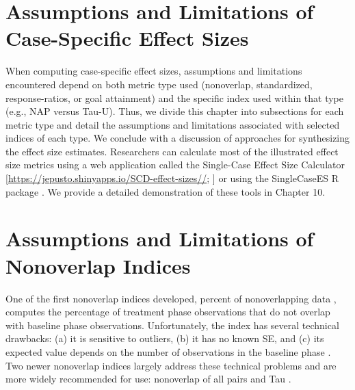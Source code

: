 \documentclass[
]{book}
\begin{document}
\hypertarget{assumptions-and-limitations-of-case-specific-effect-sizes}{%
\section{Assumptions and Limitations of Case-Specific Effect Sizes}\label{assumptions-and-limitations-of-case-specific-effect-sizes}}

When computing case-specific effect sizes, assumptions and limitations encountered depend on both metric type used (nonoverlap, standardized, response-ratios, or goal attainment) and the specific index used within that type (e.g., NAP versus Tau-U). Thus, we divide this chapter into subsections for each metric type and detail the assumptions and limitations associated with selected indices of each type. We conclude with a discussion of approaches for synthesizing the effect size estimates. Researchers can calculate most of the illustrated effect size metrics using a web application called the Single-Case Effect Size Calculator {[}\url{https://jepusto.shinyapps.io/SCD-effect-sizes//}; \citet{pustejovsky2023SingleCaseES}{]} or using the SingleCaseES R package \citep{pustejovsky2023SingleCaseES}. We provide a detailed demonstration of these tools in Chapter 10.

\hypertarget{assumptions-and-limitations-of-nonoverlap-indices}{%
\section{Assumptions and Limitations of Nonoverlap Indices}\label{assumptions-and-limitations-of-nonoverlap-indices}}

One of the first nonoverlap indices developed, percent of nonoverlapping data \citep[PND;][]{Scruggs_Mastropieri_Casto_1987}, computes the percentage of treatment phase observations that do not overlap with baseline phase observations. Unfortunately, the index has several technical drawbacks: (a) it is sensitive to outliers, (b) it has no known SE, and (c) its expected value depends on the number of observations in the baseline phase \citep{Allison_Gorman_1994, Pustejovsky2019Procedural, White1987some}. Two newer nonoverlap indices largely address these technical problems and are more widely recommended for use: nonoverlap of all pairs \citep[NAP;][]{Parker_Vannest_2009} and Tau \citep{Parker_Vannest_Davis_Sauber_2011}.
\end{document}
